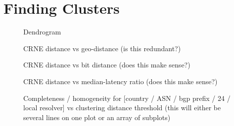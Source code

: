 \section{Finding Clusters} \label{sect:finding}


\begin{figure}
    \caption{Dendrogram}
\end{figure}


\begin{figure}
    \caption{CRNE distance vs geo-distance (is this redundant?)}
\end{figure}


\begin{figure}
    \caption{CRNE distance vs bit distance (does this make sense?)}
\end{figure}

\begin{figure}
    \caption{CRNE distance vs median-latency ratio (does this make sense?)}
\end{figure}


\begin{figure}
    \caption{Completeness / homogeneity for [country / ASN / bgp prefix / 24 / local resolver] vs clustering distance threshold (this will either be several lines on one plot or an array of subplots)}
\end{figure}

